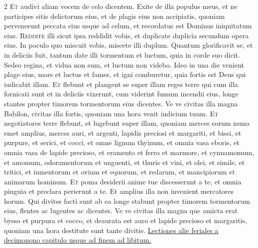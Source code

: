 \begin{multicols*}{2}
\lettrine[lines=2]{\zallmancaps \color{Red} E}{t} audivi aliam vocem de celo dicentem. Exite de illa populus meus, et ne participes sitis delictorum eius, et de plagis eius non accipiatis, quoniam pervenerunt peccata eius usque ad celum, et recordatus est Dominus iniquitatum eius.
\lettrine[lines=2]{\zallmancaps \color{Blue} R}{eddite} illi sicut ipsa reddidit vobis, et duplicate duplicia secundum opera eius. In poculo quo miscuit vobis, miscete illi duplum. Quantum glorificavit se, et in deliciis fuit, tantum date illi tormentum et luctum, quia in corde suo dicit. Sedeo regina, et vidua non sum, et luctum non videbo. Ideo in una die venient plage eius, mors et luctus et fames, et igni comburetur, quia fortis est Deus qui iudicabit illam.
\lettrine[lines=2]{\zallmancaps \color{Red} E}{t} flebunt et plangent se super illam reges terre qui cum illa fornicati sunt et in deliciis vixerunt, cum viderint fumum incendii eius, longe stantes propter timorem tormentorum eius dicentes. Ve ve civitas illa magna Babilon, civitas illa fortis, quoniam una hora venit iudicium tuum.
\lettrine[lines=2]{\zallmancaps \color{Blue} E}{t} negotiatores terre flebunt, et lugebunt super illam, quoniam merces eorum nemo emet amplius, merces auri, et argenti, lapidis preciosi et margariti, et bissi, et purpure, et serici, et cocci, et omne lignum thyinum, et omnia vasa eboris, et omnia vasa de lapide precioso, et eramento et ferro et marmore, et cynnamomum, et amomum, odoramentorum et unguenti, et thuris et vini, et olei, et simile, et tritici, et iumentorum et ovium et equorum, et redarum, et mancipiorum et animarum hominum.
\lettrine[lines=2]{\zallmancaps \color{Red} E}{t} poma desiderii anime tue discesserunt a te, et omnia pinguia et preclara perierunt a te. Et amplius illa non invenient mercatores horum. Qui divites facti sunt ab ea longe stabunt propter timorem tormentorum eius, flentes ac lugentes ac dicentes. Ve ve civitas illa magna que amicta erat bysso et purpura et cocco, et deaurata est auro et lapide precioso et margaritis, quoniam una hora destitute sunt tante divitie.
\newline \ul{Lectiones alie feriales a decimonono capitulo usque ad finem ad libitum.}
{\color{Red} }

\end{multicols*}
